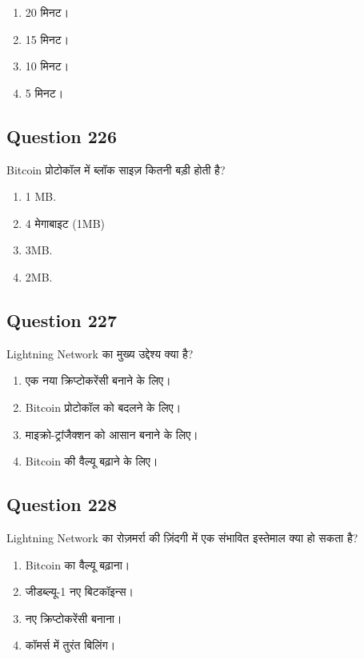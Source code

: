 \documentclass[12pt,a4paper]{article}
\begin{document}
\begin{enumerate}[label=\Alph*., leftmargin=*]
\item 20 मिनट।
\item 15 मिनट।
\item 10 मिनट।
\item 5 मिनट।
\end{enumerate}

\bigskip


\subsection*{Question 226}
Bitcoin प्रोटोकॉल में ब्लॉक साइज़ कितनी बड़ी होती है?

\begin{enumerate}[label=\Alph*., leftmargin=*]
\item 1 MB.
\item 4 मेगाबाइट (1MB)
\item 3MB.
\item 2MB.
\end{enumerate}

\bigskip


\subsection*{Question 227}
Lightning Network का मुख्य उद्देश्य क्या है?

\begin{enumerate}[label=\Alph*., leftmargin=*]
\item एक नया क्रिप्टोकरेंसी बनाने के लिए।
\item Bitcoin प्रोटोकॉल को बदलने के लिए।
\item माइक्रो-ट्रांजैक्शन को आसान बनाने के लिए।
\item Bitcoin की वैल्यू बढ़ाने के लिए।
\end{enumerate}

\bigskip


\subsection*{Question 228}
Lightning Network का रोज़मर्रा की ज़िंदगी में एक संभावित इस्तेमाल क्या हो सकता है?

\begin{enumerate}[label=\Alph*., leftmargin=*]
\item Bitcoin का वैल्यू बढ़ाना।
\item जीडब्ल्यू-1 नए बिटकॉइन्स।
\item नए क्रिप्टोकरेंसी बनाना।
\item कॉमर्स में तुरंत बिलिंग।
\end{enumerate}
\end{document}
